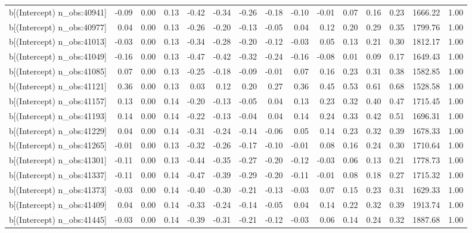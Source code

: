 \begin{table}[ht]
\begin{tabular}{rrrrrrrrrrrrrrr}
  b[(Intercept) n\_obs:40941] & -0.09 & 0.00 & 0.13 & -0.42 & -0.34 & -0.26 & -0.18 & -0.10 & -0.01 & 0.07 & 0.16 & 0.23 & 1666.22 & 1.00 \\ 
  b[(Intercept) n\_obs:40977] & 0.04 & 0.00 & 0.13 & -0.26 & -0.20 & -0.13 & -0.05 & 0.04 & 0.12 & 0.20 & 0.29 & 0.35 & 1799.76 & 1.00 \\ 
  b[(Intercept) n\_obs:41013] & -0.03 & 0.00 & 0.13 & -0.34 & -0.28 & -0.20 & -0.12 & -0.03 & 0.05 & 0.13 & 0.21 & 0.30 & 1812.17 & 1.00 \\ 
  b[(Intercept) n\_obs:41049] & -0.16 & 0.00 & 0.13 & -0.47 & -0.42 & -0.32 & -0.24 & -0.16 & -0.08 & 0.01 & 0.09 & 0.17 & 1649.43 & 1.00 \\ 
  b[(Intercept) n\_obs:41085] & 0.07 & 0.00 & 0.13 & -0.25 & -0.18 & -0.09 & -0.01 & 0.07 & 0.16 & 0.23 & 0.31 & 0.38 & 1582.85 & 1.00 \\ 
  b[(Intercept) n\_obs:41121] & 0.36 & 0.00 & 0.13 & 0.03 & 0.12 & 0.20 & 0.27 & 0.36 & 0.45 & 0.53 & 0.61 & 0.68 & 1528.58 & 1.00 \\ 
  b[(Intercept) n\_obs:41157] & 0.13 & 0.00 & 0.14 & -0.20 & -0.13 & -0.05 & 0.04 & 0.13 & 0.23 & 0.32 & 0.40 & 0.47 & 1715.45 & 1.00 \\ 
  b[(Intercept) n\_obs:41193] & 0.14 & 0.00 & 0.14 & -0.22 & -0.13 & -0.04 & 0.04 & 0.14 & 0.24 & 0.33 & 0.42 & 0.51 & 1696.31 & 1.00 \\ 
  b[(Intercept) n\_obs:41229] & 0.04 & 0.00 & 0.14 & -0.31 & -0.24 & -0.14 & -0.06 & 0.05 & 0.14 & 0.23 & 0.32 & 0.39 & 1678.33 & 1.00 \\ 
  b[(Intercept) n\_obs:41265] & -0.01 & 0.00 & 0.13 & -0.32 & -0.26 & -0.17 & -0.10 & -0.01 & 0.08 & 0.16 & 0.24 & 0.30 & 1710.64 & 1.00 \\ 
  b[(Intercept) n\_obs:41301] & -0.11 & 0.00 & 0.13 & -0.44 & -0.35 & -0.27 & -0.20 & -0.12 & -0.03 & 0.06 & 0.13 & 0.21 & 1778.73 & 1.00 \\ 
  b[(Intercept) n\_obs:41337] & -0.11 & 0.00 & 0.14 & -0.47 & -0.39 & -0.29 & -0.20 & -0.11 & -0.01 & 0.08 & 0.18 & 0.27 & 1715.32 & 1.00 \\ 
  b[(Intercept) n\_obs:41373] & -0.03 & 0.00 & 0.14 & -0.40 & -0.30 & -0.21 & -0.13 & -0.03 & 0.07 & 0.15 & 0.23 & 0.31 & 1629.33 & 1.00 \\ 
  b[(Intercept) n\_obs:41409] & 0.04 & 0.00 & 0.14 & -0.33 & -0.24 & -0.14 & -0.05 & 0.04 & 0.14 & 0.22 & 0.32 & 0.39 & 1913.74 & 1.00 \\ 
  b[(Intercept) n\_obs:41445] & -0.03 & 0.00 & 0.14 & -0.39 & -0.31 & -0.21 & -0.12 & -0.03 & 0.06 & 0.14 & 0.24 & 0.32 & 1887.68 & 1.00 \\ 

\end{tabular}
\end{table}
